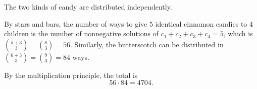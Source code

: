 The two kinds of candy are distributed independently.

By stars and bars, the number of ways to give $5$ identical cinnamon candies to $4$ children is the number of nonnegative solutions of $c_1+c_2+c_3+c_4=5$, which is $\binom{5+3}{3}=\binom83=56$. Similarly, the butterscotch can be distributed in $\binom{6+3}{3}=\binom93=84$ ways.

By the multiplication principle, the total is
\[56\cdot84=\boxed{4704}.\]
